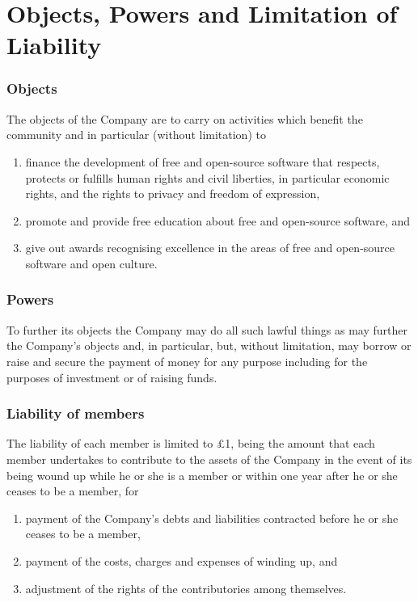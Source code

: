 \documentclass[a4paper,12pt]{article}
\renewcommand{\labelenumi}{\thesection.\arabic{enumi}}
\begin{document}
\part{Objects, Powers and Limitation of Liability}

\section{Objects}

The objects of the Company are to carry on activities which benefit the community and in particular (without limitation) to

\begin{enumerate}
  \renewcommand{\labelenumi}{(\alph{enumi})}
  \item finance the development of free and open-source software that respects, protects or fulfills human rights and civil liberties, in particular economic rights, and the rights to privacy and freedom of expression,
  \item promote and provide free education about free and open-source software, and
  \item give out awards recognising excellence in the areas of free and open-source software and open culture.
\end{enumerate}

\section{Powers}

To further its objects the Company may do all such lawful things as may further the Company’s objects and, in particular, but, without limitation, may borrow or raise and secure the payment of money for any purpose including for the purposes of investment or of raising funds.

\section{Liability of members}


The liability of each member is limited to £1, being the amount that each member undertakes to contribute to the assets of the Company in the event of its being wound up while he or she is a member or within one year after he or she ceases to be a member, for

\begin{enumerate}
  \item payment of the Company’s debts and liabilities contracted before he or she ceases to be a member,
  \item payment of the costs, charges and expenses of winding up, and
  \item adjustment of the rights of the contributories among themselves.
\end{enumerate}
\end{document}
